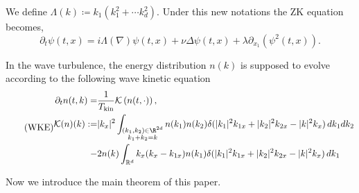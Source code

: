 We define $\Lambda(k)\coloneqq k_{1}(k_1^2+\cdots k_d^2)$. Under this new notations the ZK equation becomes,
\[
\partial_t\psi(t,x)=i\Lambda(\nabla)\psi(t,x)+\nu \Delta \psi(t,x)+\lambda \partial_{x_1}(\psi^2(t,x)).
\]

In the wave turbulence, the energy distribution $n(k)$ is supposed to evolve according to the following wave kinetic equation
\[
\tag{WKE}\label{eq.WKE}
\begin{split}
\partial_t n(t, k) =&\frac{1}{T_{\text{kin}}}\mathcal K\left(n(t, \cdot)\right),
\\
\mathcal K(n)(k):=& |k_x|^2\int_{\substack{(k_1, k_2)\in \R^{2d}\\k_1+k_2=k}}n(k_1) n(k_2)\delta(|k_1|^2k_{1x}+|k_2|^2k_{2x}-|k|^2k_{x})\, dk_1 dk_2
\\
-& 2n(k)\int_{\mathbb{R}^d}k_x(k_x-k_{1x})n(k_1) \delta(|k_1|^2k_{1x}+|k_2|^2k_{2x}-|k|^2k_{x})\, dk_1
\end{split}
\]



Now we introduce the main theorem of this paper.


